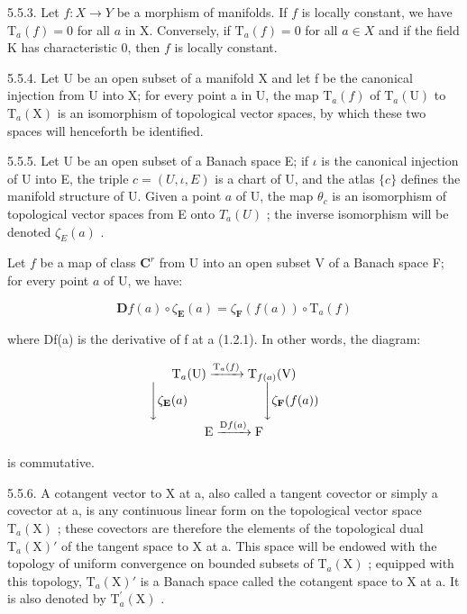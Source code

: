 5.5.3. Let \(f:X\to Y\) be a morphism of manifolds. If \(f\) is locally constant, we have \(\mathrm{T}_{a}(f)=0\) for all \(a\) in X. Conversely, if \(\mathrm{T}_{a}(f)=0\) for all \(a\in X\) and if the field K has characteristic 0, then \(f\) is locally constant.

5.5.4. Let U be an open subset of a manifold X and let f be the canonical injection from U into X; for every point a in U, the map \(\mathrm{T}_{a}(f)\) of \(\mathrm{T}_{a}(\mathrm{U})\) to \(\mathrm{T}_{a}(\mathrm{X})\) is an isomorphism of topological vector spaces, by which these two spaces will henceforth be identified.

5.5.5. Let U be an open subset of a Banach space E; if \(\iota\) is the canonical injection of U into E, the triple \(c = (U, \iota, E)\) is a chart of U, and the atlas \(\{c\}\) defines the manifold structure of U. Given a point \(a\) of U, the map \(\theta_c\) is an isomorphism of topological vector spaces from E onto \(T_a(U)\) ; the inverse isomorphism will be denoted \(\zeta_E(a)\) .

Let \(f\) be a map of class \(\mathbf{C}^{r}\) from U into an open subset V of a Banach space F; for every point \(a\) of U, we have:

\[
\mathbf {D} f (a) \circ \zeta_ {\mathbf {E}} (a) = \zeta_ {\mathbf {F}} (f (a)) \circ \mathrm{T} _ {a} (f)
\]

where Df(a) is the derivative of f at a (1.2.1). In other words, the diagram:

\[
\begin{array}{c} \mathrm{T} _ {a} (\mathrm{U}) \xrightarrow {\mathrm{T} _ {a} (f)} \mathrm{T} _ {f (a)} (\mathrm{V}) \\ \Biggl \downarrow \zeta_ {\mathbf {E}} (a) \qquad \qquad \qquad \Biggl \downarrow \zeta_ {\mathbf {F}} (f (a)) \\ \mathrm{E} \xrightarrow {\mathrm{D} f (a)} \mathrm{F} \end{array}
\]

is commutative.

5.5.6. A cotangent vector to X at a, also called a tangent covector or simply a covector at a, is any continuous linear form on the topological vector space \(\mathrm{T}_{a}(\mathrm{X})\) ; these covectors are therefore the elements of the topological dual \(\mathrm{T}_{a}(\mathrm{X})'\) of the tangent space to X at a. This space will be endowed with the topology of uniform convergence on bounded subsets of \(\mathrm{T}_{a}(\mathrm{X})\) ; equipped with this topology, \(\mathrm{T}_{a}(\mathrm{X})'\) is a Banach space called the cotangent space to X at a. It is also denoted by \(\mathrm{T}_{a}^{\prime}(\mathrm{X})\) .

